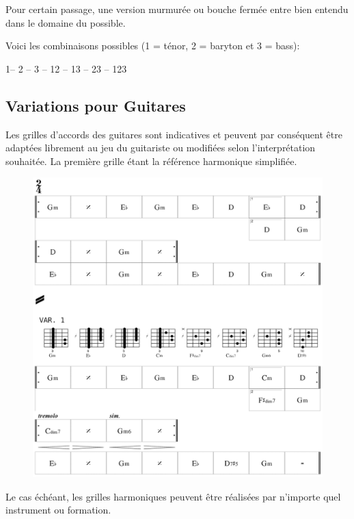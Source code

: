 Pour certain passage, une version murmurée ou bouche fermée entre bien entendu dans le domaine du possible.


Voici les combinaisons possibles (1 =  ténor, 2 = baryton et 3 =  bass): 

1-- 2 -- 3 -- 12 -- 13 -- 23 -- 123

\subsection*{Variations pour Guitares}
Les grilles d'accords des guitares sont indicatives et peuvent par conséquent être adaptées librement au jeu du guitariste ou modifiées selon l'interprétation souhaitée. La première grille étant la référence harmonique simplifiée.

 \begin{figure}[H]
\begin{center}
\includegraphics[scale=0.33]{img/dlc2}
\end{center}
\end{figure}
Le cas échéant, les grilles harmoniques peuvent être réalisées par n'importe quel instrument ou formation.
 
